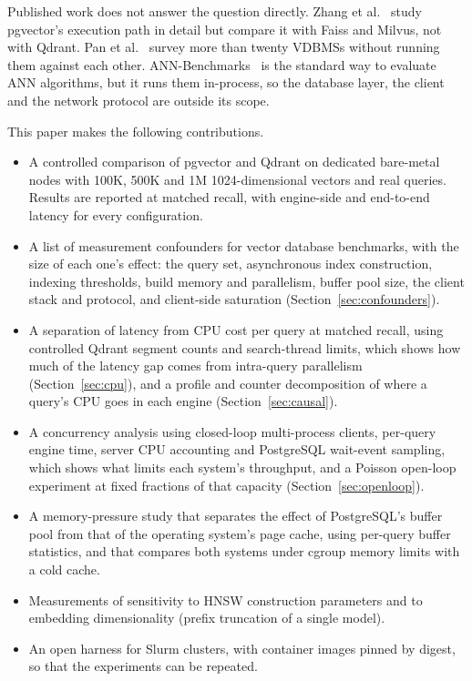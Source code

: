 \documentclass[sigconf, nonacm]{acmart}
\begin{document}
Published work does not answer the question directly. Zhang et al.~\cite{zhang2024}
study pgvector's execution path in detail but compare it with Faiss and Milvus, not with
Qdrant. Pan et al.~\cite{pan2024survey} survey more than twenty VDBMSs without running
them against each other. ANN-Benchmarks~\cite{aumuller2020} is the standard way to
evaluate ANN algorithms, but it runs them in-process, so the database layer, the client
and the network protocol are outside its scope.

This paper makes the following contributions.
\begin{itemize}
  \item A controlled comparison of pgvector and Qdrant on dedicated bare-metal nodes
    with 100K, 500K and 1M 1024-dimensional vectors and real queries. Results are
    reported at matched recall, with engine-side and end-to-end latency for every
    configuration.
  \item A list of measurement confounders for vector database benchmarks, with the
    size of each one's effect: the query set, asynchronous index construction,
    indexing thresholds, build memory and parallelism, buffer pool size, the client
    stack and protocol, and client-side saturation (Section~\ref{sec:confounders}).
  \item A separation of latency from CPU cost per query at matched recall, using
    controlled Qdrant segment counts and search-thread limits, which shows how much of
    the latency gap comes from intra-query parallelism (Section~\ref{sec:cpu}), and a
    profile and counter decomposition of where a query's CPU goes in each engine
    (Section~\ref{sec:causal}).
  \item A concurrency analysis using closed-loop multi-process clients, per-query engine
    time, server CPU accounting and PostgreSQL wait-event sampling, which shows what
    limits each system's throughput, and a Poisson open-loop experiment at fixed fractions of that capacity
    (Section~\ref{sec:openloop}).
  \item A memory-pressure study that separates the effect of PostgreSQL's buffer pool
    from that of the operating system's page cache, using per-query buffer statistics,
    and that compares both systems under cgroup memory limits with a cold cache.
  \item Measurements of sensitivity to HNSW construction parameters and to embedding
    dimensionality (prefix truncation of a single model).
  \item An open harness for Slurm clusters, with container images pinned by digest, so
    that the experiments can be repeated.
\end{itemize}
\end{document}
